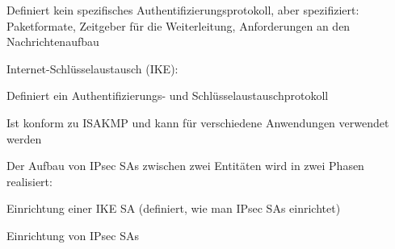 \documentclass[a4paper]{article}
\begin{document}
\begin{multicols}{3}
\begin{itemize*}
\begin{itemize*}
\begin{itemize*}
                        \item Definiert kein spezifisches Authentifizierungsprotokoll, aber spezifiziert: Paketformate, Zeitgeber für die Weiterleitung, Anforderungen an den Nachrichtenaufbau
                  \end{itemize*}
                  \item Internet-Schlüsselaustausch (IKE):
                  \begin{itemize*}
                        \item Definiert ein Authentifizierungs- und Schlüsselaustauschprotokoll
                        \item Ist konform zu ISAKMP und kann für verschiedene Anwendungen verwendet werden
                        \item Der Aufbau von IPsec SAs zwischen zwei Entitäten wird in zwei Phasen realisiert:
                        \item Einrichtung einer IKE SA (definiert, wie man IPsec SAs einrichtet)
                        \item Einrichtung von IPsec SAs
                  \end{itemize*}
            \end{itemize*}
      \end{itemize*}


\end{multicols}
\end{document}
